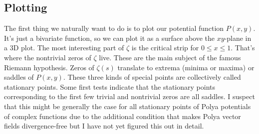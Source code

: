 \documentclass[12pt]{article}
\begin{document}
\subsection{Plotting}
The first thing we naturally want to do is to plot our potential function $P(x,y)$. It's just a bivariate function, so we can plot it as a surface above the $xy$-plane in a 3D plot. The most interesting part of $\zeta$ is the critical strip for $0 \leq x \leq 1$. That's where the nontrivial zeros of $\zeta$ live. These are the main subject of the famous Riemann hypothesis. Zeros of $\zeta(s)$ translate to extrema (minima or maxima) or saddles of $P(x,y)$. These three kinds of special points are collectively called stationary points. Some first tests indicate that the stationary points corresponding to the first few trivial and nontrivial zeros are all saddles. I suspect that this might be generally the case for all stationary points of Polya potentials of complex functions due to the additional condition that makes Polya vector fields divergence-free but I have not yet figured this out in detail.


\end{document}
